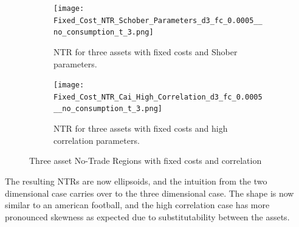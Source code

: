 \documentclass[11pt]{article}
\begin{document}
\begin{figure}[!ht]
    \centering
    \begin{subfigure}[t]{0.48\textwidth}
        \centering
        \texttt{[image: Fixed\_Cost\_NTR\_Schober\_Parameters\_d3\_fc\_0.0005\_\_no\_consumption\_t\_3.png]}
        \caption{NTR for three assets with fixed costs and Shober parameters.}
        \label{fig: NTR_Fixed_3d_Shober}
    
    \end{subfigure}%
    \hfill
    \begin{subfigure}[t]{0.48\textwidth}
        \centering
        \texttt{[image: Fixed\_Cost\_NTR\_Cai\_High\_Correlation\_d3\_fc\_0.0005\_\_no\_consumption\_t\_3.png]}
        \caption{NTR for three assets with fixed costs and high correlation parameters.}
        \label{fig: NTR_Fixed_3d_high_correlation}
    \end{subfigure}
    \caption{Three asset No-Trade Regions with fixed costs and correlation}
\end{figure}
\FloatBarrier %
The resulting NTRs are now ellipsoids, and the intuition from the two dimensional case carries over to the three dimensional case.
The shape is now similar to an american football, and the high correlation case has more pronounced skewness as expected due to substitutability between the assets.
\end{document}
